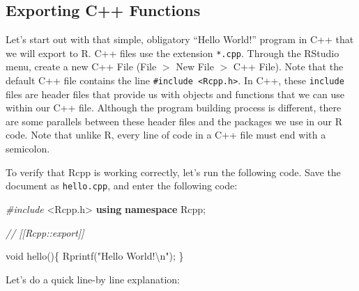 \documentclass[
]{krantz}
\makeatletter
\newenvironment{Shaded}{\begin{snugshade}}{\end{snugshade}}
\newcommand{\CommentTok}[1]{\textcolor[rgb]{0.37,0.37,0.37}{\textit{#1}}}
\newcommand{\DataTypeTok}[1]{\textcolor[rgb]{0.27,0.27,0.27}{#1}}
\newcommand{\ImportTok}[1]{#1}
\newcommand{\KeywordTok}[1]{\textcolor[rgb]{0.27,0.27,0.27}{\textbf{#1}}}
\newcommand{\NormalTok}[1]{#1}
\newcommand{\PreprocessorTok}[1]{\textcolor[rgb]{0.37,0.37,0.37}{\textit{#1}}}
\newcommand{\SpecialCharTok}[1]{\textcolor[rgb]{0,0,0}{#1}}
\newcommand{\StringTok}[1]{\textcolor[rgb]{0.5,0.5,0.5}{#1}}
\newenvironment{kframe}{%
\medskip{}
\setlength{\fboxsep}{.8em}
 \def\at@end@of@kframe{}%
 \ifinner\ifhmode%
  \def\at@end@of@kframe{\end{minipage}}%
  \begin{minipage}{\columnwidth}%
 \fi\fi%
 \def\FrameCommand##1{\hskip\@totalleftmargin \hskip-\fboxsep
 \colorbox{shadecolor}{##1}\hskip-\fboxsep
     \hskip-\linewidth \hskip-\@totalleftmargin \hskip\columnwidth}%
 \MakeFramed {\advance\hsize-\width
   \@totalleftmargin\z@ \linewidth\hsize
   \@setminipage}}%
 {\par\unskip\endMakeFramed%
 \at@end@of@kframe}
\renewenvironment{Shaded}{\begin{kframe}}{\end{kframe}}
\makeatother
\begin{document}
\hypertarget{exporting-c-functions}{%
\subsection{Exporting C++ Functions}\label{exporting-c-functions}}

Let's start out with that simple, obligatory ``Hello World!'' program in C++ that we will export to R. C++ files use the extension \texttt{*.cpp}. Through the RStudio menu, create a new C++ File (File \(>\) New File \(>\) C++ File). Note that the default C++ file contains the line \texttt{\#include\ \textless{}Rcpp.h\textgreater{}}. In C++, these \texttt{include} files are header files that provide us with objects and functions that we can use within our C++ file. Although the program building process is different, there are some parallels between these header files and the packages we use in our R code. Note that unlike R, every line of code in a C++ file must end with a semicolon.

To verify that Rcpp is working correctly, let's run the following code. Save the document as \texttt{hello.cpp}, and enter the following code:

\begin{Shaded}
\begin{Highlighting}[]
\PreprocessorTok{\#include }\ImportTok{\textless{}Rcpp.h\textgreater{}}
\KeywordTok{using} \KeywordTok{namespace}\NormalTok{ Rcpp;}

\CommentTok{// [[Rcpp::export]]}

\DataTypeTok{void}\NormalTok{ hello()\{}
\NormalTok{  Rprintf(}\StringTok{"Hello World!}\SpecialCharTok{\textbackslash{}n}\StringTok{"}\NormalTok{);}
\NormalTok{\}}
\end{Highlighting}
\end{Shaded}

Let's do a quick line-by line explanation:
\end{document}
